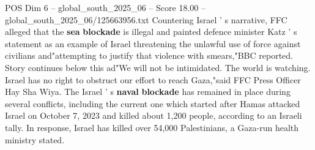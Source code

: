 \begin{textsample}{POS Dim 6 – global\_south\_2025\_06 – Score 18.00 – global\_south\_2025\_06/125663956.txt}
Countering Israel ' s narrative, FFC alleged that the \textbf{sea} \textbf{blockade} is illegal and painted defence minister Katz ' s statement as an example of Israel threatening the unlawful use of force against civilians and"attempting to justify that violence with smears,"BBC reported.
Story continues below this ad"We will not be intimidated.
The world is watching.
Israel has no right to obstruct our effort to reach Gaza,"said FFC Press Officer Hay Sha Wiya.
The Israel ' s \textbf{naval} \textbf{blockade} has remained in place during several conflicts, including the current one which started after Hamas attacked Israel on October 7, 2023 and killed about 1,200 people, according to an Israeli tally.
In response, Israel has killed over 54,000 Palestinians, a Gaza-run health ministry stated.

\end{textsample}

